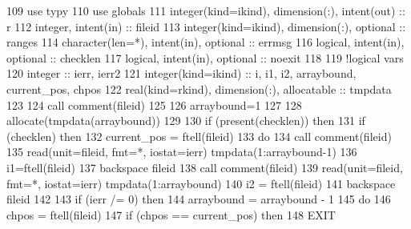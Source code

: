 \begin{DoxyCode}
109       \textcolor{keywordtype}{use }typy
110       \textcolor{keywordtype}{use }globals
111       \textcolor{keywordtype}{integer(kind=ikind)}, \textcolor{keywordtype}{dimension(:)}, \textcolor{keywordtype}{intent(out)} :: r
112       \textcolor{keywordtype}{integer}, \textcolor{keywordtype}{intent(in)} :: fileid
113       \textcolor{keywordtype}{integer(kind=ikind)}, \textcolor{keywordtype}{dimension(:)}, \textcolor{keywordtype}{optional} :: ranges
114       \textcolor{keywordtype}{character(len=*)}, \textcolor{keywordtype}{intent(in)}, \textcolor{keywordtype}{optional} :: errmsg
116       \textcolor{keywordtype}{logical}, \textcolor{keywordtype}{intent(in)}, \textcolor{keywordtype}{optional} :: checklen
117       \textcolor{keywordtype}{logical}, \textcolor{keywordtype}{intent(in)}, \textcolor{keywordtype}{optional} :: noexit
118       
119             \textcolor{comment}{!logical vars}
120       \textcolor{keywordtype}{integer} :: ierr, ierr2
121       \textcolor{keywordtype}{integer(kind=ikind)} :: i, i1, i2, arraybound, current\_pos, chpos
122       \textcolor{keywordtype}{real(kind=rkind)}, \textcolor{keywordtype}{dimension(:)}, \textcolor{keywordtype}{allocatable} :: tmpdata
123       
124       \textcolor{keyword}{call }comment(fileid)
125       
126       arraybound=1
127       
128       \textcolor{keyword}{allocate}(tmpdata(arraybound))
129       
130       \textcolor{keywordflow}{if} (\textcolor{keyword}{present}(checklen)) \textcolor{keywordflow}{then}
131         \textcolor{keywordflow}{if} (checklen) \textcolor{keywordflow}{then}
132           current\_pos = ftell(fileid)
133           \textcolor{keywordflow}{do} 
134             \textcolor{keyword}{call }comment(fileid)
135             \textcolor{keyword}{read}(unit=fileid, fmt=*, iostat=ierr) tmpdata(1:arraybound-1\textcolor{comment}{)}
136 \textcolor{comment}{            i1=ftell(fileid)}
137 \textcolor{comment}{            backspace fileid}
138 \textcolor{comment}{            }\textcolor{keyword}{call }comment(fileid)
139             \textcolor{keyword}{read}(unit=fileid, fmt=*, iostat=ierr) tmpdata(1:arraybound)
140             i2 = ftell(fileid)
141             backspace fileid
142            
143             \textcolor{keywordflow}{if} (ierr /= 0) \textcolor{keywordflow}{then}
144               arraybound = arraybound - 1
145               \textcolor{keywordflow}{do}
146                 chpos = ftell(fileid)
147                 \textcolor{keywordflow}{if} (chpos == current\_pos) \textcolor{keywordflow}{then}
148                   \textcolor{keywordflow}{EXIT}

\end{DoxyCode}
